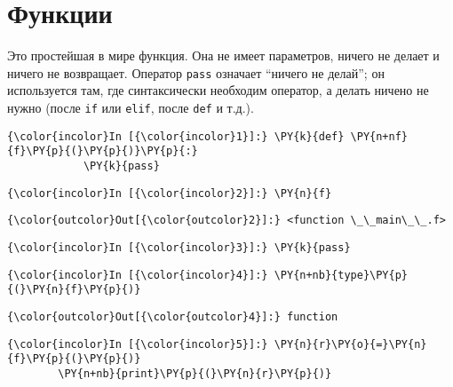 \section{Функции}
\label{S107}

Это простейшая в мире функция. Она не имеет параметров, ничего не делает
и ничего не возвращает. Оператор \texttt{pass} означает ``ничего не
делай''; он используется там, где синтаксически необходим оператор, а
делать ничено не нужно (после \texttt{if} или \texttt{elif}, после
\texttt{def} и т.д.).

    \begin{Verbatim}[commandchars=\\\{\}]
{\color{incolor}In [{\color{incolor}1}]:} \PY{k}{def} \PY{n+nf}{f}\PY{p}{(}\PY{p}{)}\PY{p}{:}
            \PY{k}{pass}
\end{Verbatim}

    \begin{Verbatim}[commandchars=\\\{\}]
{\color{incolor}In [{\color{incolor}2}]:} \PY{n}{f}
\end{Verbatim}

            \begin{Verbatim}[commandchars=\\\{\}]
{\color{outcolor}Out[{\color{outcolor}2}]:} <function \_\_main\_\_.f>
\end{Verbatim}
        
    \begin{Verbatim}[commandchars=\\\{\}]
{\color{incolor}In [{\color{incolor}3}]:} \PY{k}{pass}
\end{Verbatim}

    \begin{Verbatim}[commandchars=\\\{\}]
{\color{incolor}In [{\color{incolor}4}]:} \PY{n+nb}{type}\PY{p}{(}\PY{n}{f}\PY{p}{)}
\end{Verbatim}

            \begin{Verbatim}[commandchars=\\\{\}]
{\color{outcolor}Out[{\color{outcolor}4}]:} function
\end{Verbatim}
        
    \begin{Verbatim}[commandchars=\\\{\}]
{\color{incolor}In [{\color{incolor}5}]:} \PY{n}{r}\PY{o}{=}\PY{n}{f}\PY{p}{(}\PY{p}{)}
        \PY{n+nb}{print}\PY{p}{(}\PY{n}{r}\PY{p}{)}
\end{Verbatim}

